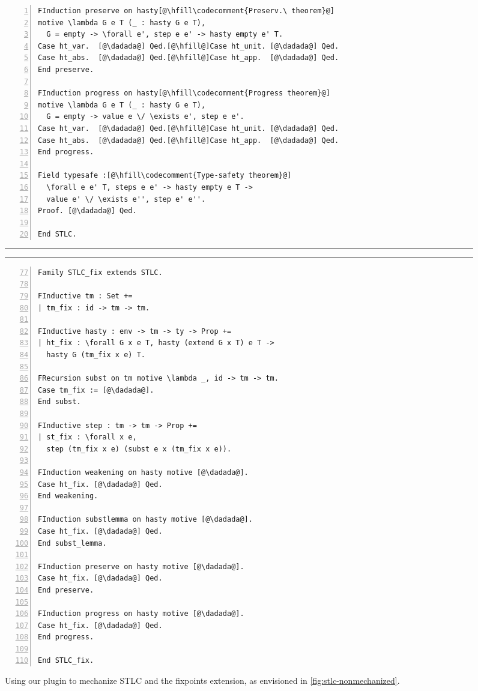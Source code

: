 \begin{figure}
\begin{minipage}{\textwidth}
\begin{multicols}{2}
\begin{lstlisting}[numbers=left]
FInduction preserve on hasty[@\hfill\codecomment{Preserv.\ theorem}@]
motive \lambda G e T (_ : hasty G e T),
  G = empty -> \forall e', step e e' -> hasty empty e' T.
Case ht_var.  [@\dadada@] Qed.[@\hfill@]Case ht_unit. [@\dadada@] Qed.
Case ht_abs.  [@\dadada@] Qed.[@\hfill@]Case ht_app.  [@\dadada@] Qed.
End preserve.

FInduction progress on hasty[@\hfill\codecomment{Progress theorem}@]
motive \lambda G e T (_ : hasty G e T),
  G = empty -> value e \/ \exists e', step e e'.
Case ht_var.  [@\dadada@] Qed.[@\hfill@]Case ht_unit. [@\dadada@] Qed.
Case ht_abs.  [@\dadada@] Qed.[@\hfill@]Case ht_app.  [@\dadada@] Qed.
End progress.

Field typesafe :[@\hfill\codecomment{Type-safety theorem}@]
  \forall e e' T, steps e e' -> hasty empty e T ->
  value e' \/ \exists e'', step e' e''.
Proof. [@\dadada@] Qed.

End STLC.
\end{lstlisting}
\medskip

\hrule
\hrule
\medskip

\begin{lstlisting}[numbers=left,firstnumber=77]
Family STLC_fix extends STLC.

FInductive tm : Set +=
| tm_fix : id -> tm -> tm.

FInductive hasty : env -> tm -> ty -> Prop +=
| ht_fix : \forall G x e T, hasty (extend G x T) e T ->
  hasty G (tm_fix x e) T.

FRecursion subst on tm motive \lambda _, id -> tm -> tm.
Case tm_fix := [@\dadada@].
End subst.

FInductive step : tm -> tm -> Prop +=
| st_fix : \forall x e,
  step (tm_fix x e) (subst e x (tm_fix x e)).

FInduction weakening on hasty motive [@\dadada@].
Case ht_fix. [@\dadada@] Qed.
End weakening.

FInduction substlemma on hasty motive [@\dadada@].
Case ht_fix. [@\dadada@] Qed.
End subst_lemma.

FInduction preserve on hasty motive [@\dadada@].
Case ht_fix. [@\dadada@] Qed.
End preserve.

FInduction progress on hasty motive [@\dadada@].
Case ht_fix. [@\dadada@] Qed.
End progress.

End STLC_fix.
\end{lstlisting}

\end{multicols}
\end{minipage}
\caption{Using our plugin to mechanize STLC and the fixpoints extension,
as envisioned in \cref{fig:stlc-nonmechanized}.}
\label{fig:stlc-mechanized}
\end{figure}




